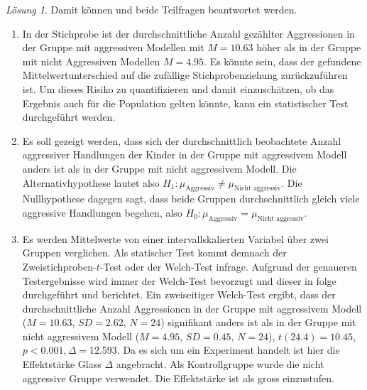 \documentclass[
]{book}
\providecommand{\tightlist}{%
  \setlength{\itemsep}{0pt}\setlength{\parskip}{0pt}}
\theoremstyle{definition}
\theoremstyle{definition}
\theoremstyle{definition}
\theoremstyle{definition}
\theoremstyle{remark}
\newtheorem*{solution}{Lösung}
\begin{document}
\begin{solution}
Damit können und beide Teilfragen beantwortet werden.

\begin{enumerate}
\def\labelenumi{\alph{enumi})}
\tightlist
\item
  In der Stichprobe ist der durchschnittliche Anzahl gezählter Aggressionen in der Gruppe mit aggressiven Modellen mit \(M = 10.63\) höher als in der Gruppe mit nicht Aggressiven Modellen \(M = 4.95\). Es könnte sein, dass der gefundene Mittelwertunterschied auf die zufällige Stichprobenziehung zurückzuführen ist. Um dieses Risiko zu quantifizieren und damit einzuschätzen, ob das Ergebnis auch für die Population gelten könnte, kann ein statistischer Test durchgeführt werden.
\item
  Es soll gezeigt werden, dass sich der durchschnittlich beobachtete Anzahl aggressiver Handlungen der Kinder in der Gruppe mit aggressivem Modell anders ist als in der Gruppe mit nicht aggressivem Modell. Die Alternativhypothese lautet also \(H_1: \mu_\text{Aggressiv} \neq \mu_\text{Nicht aggressiv}\). Die Nullhypothese dagegen sagt, dass beide Gruppen durchschnittlich gleich viele aggressive Handlungen begehen, also \(H_0: \mu_\text{Aggressiv} = \mu_\text{Nicht aggressiv}\).
\item
  Es werden Mittelwerte von einer intervallskalierten Variabel über zwei Gruppen verglichen. Als statischer Test kommt demnach der Zweistichproben-\(t\)-Test oder der Welch-Test infrage. Aufgrund der genaueren Testergebnisse wird immer der Welch-Test bevorzugt und dieser in folge durchgeführt und berichtet. Ein zweiseitiger Welch-Test ergibt, dass der durchschnittliche Anzahl Aggressionen in der Gruppe mit aggressivem Modell (\(M = 10.63\), \(SD = 2.62\), \(N = 24\)) signifikant anders ist als in der Gruppe mit nicht aggressivem Modell (\(M = 4.95\), \(SD = 0.45\), \(N = 24\)), \(t(24.4) = 10.45\), \(p < 0.001, \Delta = 12.593\). Da es sich um ein Experiment handelt ist hier die Effektstärke Glass \(\Delta\) angebracht. Als Kontrollgruppe wurde die nicht aggressive Gruppe verwendet. Die Effektstärke ist als gross einzustufen.
\end{enumerate}

\end{solution}
\end{document}
